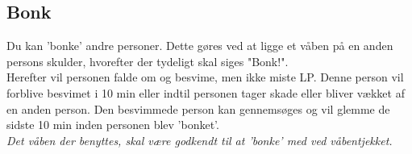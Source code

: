 \subsection*{Bonk}
Du kan 'bonke' andre personer. Dette gøres ved at ligge et våben på en anden persons skulder, hvorefter der tydeligt skal siges "Bonk!".\\
Herefter vil personen falde om og besvime, men ikke miste LP. Denne person vil forblive besvimet i 10 min eller indtil personen tager skade eller bliver vækket af en anden person. Den besvimmede person kan gennemsøges og vil glemme de sidste 10 min inden personen blev 'bonket'.\\
\emph{Det våben der benyttes, skal være godkendt til at 'bonke' med ved våbentjekket.}\\